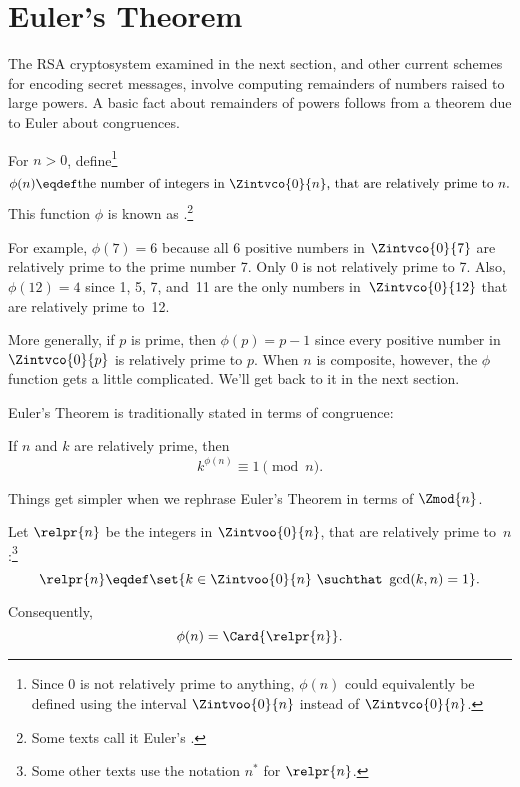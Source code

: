 \section{Euler's Theorem}\label{Euler_sec}

The RSA cryptosystem examined in the next section, and other current
schemes for encoding secret messages, involve computing remainders of
numbers raised to large powers.  A basic fact about remainders of
powers follows from a theorem due to Euler about congruences.

\begin{definition}
For $n>0$, define\footnote{Since 0 is not relatively prime to
  anything, $\phi(n)$ could equivalently be defined using the
  interval $\Zintvoo{0}{n}$ instead of $\Zintvco{0}{n}$.}
\[
\phi(n) \eqdef \text{the number of integers in $\Zintvco{0}{n}$, that are relatively prime
  to~$n$.}
\]
This function $\phi$ is known as .\footnote{Some texts call it Euler's .}
\end{definition}

For example, $\phi(7) = 6$ because all 6 positive numbers in $\Zintvco{0}{7}$
  are relatively prime to the prime number 7.  Only 0 is not
  relatively prime to 7.   Also, $\phi(12) = 4$ since 1, 5, 7,
  and~11 are the only numbers in~$\Zintvco{0}{12}$ that are relatively prime
    to~12.

More generally, if $p$ is prime, then $\phi(p) = p - 1$ since every
positive number in $\Zintvco{0}{p}$ is relatively prime to $p$.  When $n$ is
  composite, however, the $\phi$ function gets a little complicated.
  We'll get back to it in the next section.

Euler's Theorem is traditionally stated in terms of congruence:
\begin{theorem*}
If $n$ and $k$ are relatively prime, then
\begin{equation}\label{cong:euler}
k^{\phi(n)} \equiv 1 \pmod{n}.
\end{equation}
\end{theorem*}

Things get simpler when we rephrase Euler's Theorem in terms of
$\Zmod{n}$.

\begin{definition}
Let $\relpr{n}$  be the integers in $\Zintvoo{0}{n}$, that are relatively
  prime to~$n$:\footnote{Some other texts use the notation $n^*$ for
  $\relpr{n}$.}
\begin{equation}\label{def:relpr}
\relpr{n} \eqdef \set{k \in \Zintvoo{0}{n}\ \suchthat\ \gcd(k,n) = 1}.
\end{equation}
\end{definition}
Consequently,
\[
\phi(n) = \Card{\relpr{n}}.
\]

